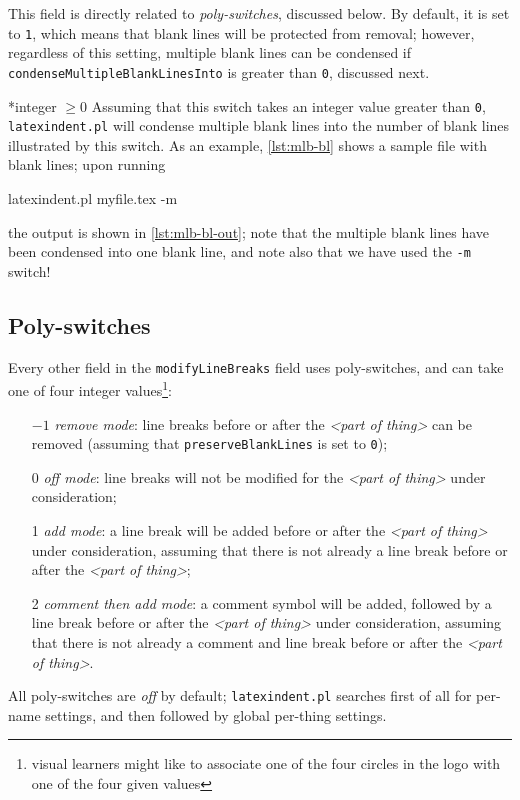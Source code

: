 	This field is directly related to \emph{poly-switches}, discussed below.
	By default, it is set to \texttt{1}, which means that blank lines will
	be protected from removal; however, regardless of this setting, multiple
	blank lines can be condensed if \texttt{condenseMultipleBlankLinesInto} is
	greater than \texttt{0}, discussed next.

*{integer $\geq 0$}
	Assuming that this switch takes an integer value greater than \texttt{0}, \texttt{latexindent.pl} will condense multiple blank lines into
	the number of blank lines illustrated by this switch. As an example, \cref{lst:mlb-bl} shows a sample file
	with blank lines; upon running
	\begin{commandshell}
latexindent.pl myfile.tex -m  
\end{commandshell}
	the output is shown in \cref{lst:mlb-bl-out}; note that the multiple blank lines have been
	condensed into one blank line, and note also that we have used the \texttt{-m} switch!

	\begin{minipage}{.45\textwidth}
	\end{minipage}%
	\hfill
	\begin{minipage}{.45\textwidth}
	\end{minipage}

\subsection{Poly-switches}
	Every other field in the \texttt{modifyLineBreaks} field uses poly-switches, and can take
	one of four integer values\footnote{visual learners might like to associate one of the four circles in the logo with one of the four given values}:
	\begin{itemize}[font=\bfseries]
		\item[$-1$] \emph{remove mode}: line breaks before or after the \emph{<part of thing>} can be removed (assuming that \texttt{preserveBlankLines} is set to \texttt{0});
		\item[0] \emph{off mode}: line breaks will not be modified for the \emph{<part of thing>} under consideration;
		\item[1] \emph{add mode}: a line break will be added before or after the \emph{<part of thing>} under consideration, assuming that
		      there is not already a line break before or after the \emph{<part of thing>};
		\item[2] \emph{comment then add mode}: a comment symbol will be added, followed by a line break before or after the \emph{<part of thing>} under consideration, assuming that
		      there is not already a comment and line break before or after the \emph{<part of thing>}.
	\end{itemize}
	All poly-switches are \emph{off} by default; \texttt{latexindent.pl} searches first of all for per-name settings, and then followed by global per-thing settings.

